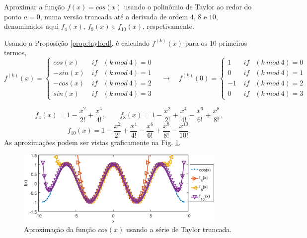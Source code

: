 \begin{example}
Aproximar a função $f(x)=cos(x)$ usando o polinômio de Taylor ao redor do ponto $a=0$,
numa versão truncada até a derivada de ordem $4$, $8$ e $10$,
denominados aqui $f_4(x)$, $f_8(x)$ e $f_{10}(x)$, respetivamente.
\end{example}
\begin{SolutionT}
Usando a Proposição \ref{prop:taylord}, é calculado $f^{(k)}(x)$ para os 10 primeiros termos,
\begin{equation}
f^{(k)}(x)=
\left\{
\begin{matrix}
cos(x) & ~if & (k~mod~4)=0\\
-sin(x)& ~if & (k~mod~4)=1\\
-cos(x)& ~if & (k~mod~4)=2\\
sin(x) & ~if & (k~mod~4)=3
\end{matrix}
\right.
\quad \rightarrow \quad
f^{(k)}(0)=
\left\{
\begin{matrix}
1 & ~if & (k~mod~4)=0\\
0& ~if & (k~mod~4)=1\\
-1& ~if & (k~mod~4)=2\\
0 & ~if & (k~mod~4)=3
\end{matrix}
\right.
\end{equation}

\begin{equation}
f_{4}(x)=
1
-\frac{x^{2}}{2!} 
+\frac{x^{4}}{4!},
\qquad 
f_{8}(x)=
1
-\frac{x^{2}}{2!} 
+\frac{x^{4}}{4!} 
-\frac{x^{6}}{6!} 
+\frac{x^{8}}{8!}, 
\end{equation}
\begin{equation}
f_{10}(x)=
1
-\frac{x^{2}}{2!} 
+\frac{x^{4}}{4!} 
-\frac{x^{6}}{6!} 
+\frac{x^{8}}{8!} 
-\frac{x^{10}}{10!}. 
\end{equation}
As aproximações podem ser vistas graficamente na Fig. \ref{fig:taylore}.
\end{SolutionT}

\begin{figure}[!h]
  \centering
    \includegraphics[width=0.90\textwidth]{chapters/funcoes/mcode/taylorR1R1/taylore.eps}
  \caption{Aproximação da função $cos(x)$ usando a série de Taylor truncada.}
    \label{fig:taylore}
\end{figure}
 


